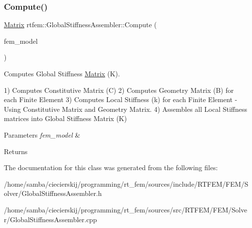 \subsubsection{\texorpdfstring{Compute()}{Compute()}}
{\footnotesize\ttfamily \hyperlink{classrtfem_1_1Matrix}{Matrix} rtfem\+::\+Global\+Stiffness\+Assembler\+::\+Compute (\begin{DoxyParamCaption}\item[{const std\+::shared\+\_\+ptr$<$ \hyperlink{classrtfem_1_1FEMModel}{F\+E\+M\+Model} $>$}]{fem\+\_\+model }\end{DoxyParamCaption})}

Computes Global Stiffness \hyperlink{classrtfem_1_1Matrix}{Matrix} (K). \begin{DoxyVerb} 1) Computes Constitutive Matrix (C)
 2) Computes Geometry Matrix (B) for each Finite Element
 3) Computes Local Stiffness (k) for each Finite Element
     - Using Constitutive Matrix and Geometry Matrix.
 4) Assembles all Local Stiffness matrices into Global Stiffness Matrix (K)
\end{DoxyVerb}



\begin{DoxyParams}{Parameters}
{\em fem\+\_\+model} & \\
\hline
\end{DoxyParams}
\begin{DoxyReturn}{Returns}

\end{DoxyReturn}


The documentation for this class was generated from the following files\+:\begin{DoxyCompactItemize}
\item 
/home/samba/ciecierskij/programming/rt\+\_\+fem/sources/include/\+R\+T\+F\+E\+M/\+F\+E\+M/\+Solver/Global\+Stiffness\+Assembler.\+h\item 
/home/samba/ciecierskij/programming/rt\+\_\+fem/sources/src/\+R\+T\+F\+E\+M/\+F\+E\+M/\+Solver/Global\+Stiffness\+Assembler.\+cpp\end{DoxyCompactItemize}
